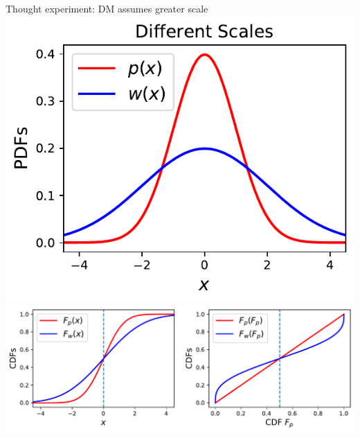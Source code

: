 \begin{frame}{Thought experiment: DM assumes greater scale}
\centering
	\includegraphics[width=.35\textwidth]{../../figs/2GaussianPDFs2Scales.pdf} \\
	\includegraphics[width=.8\textwidth]{../../figs/mapping_cdfs_noarrows.pdf} \\
\end{frame}


